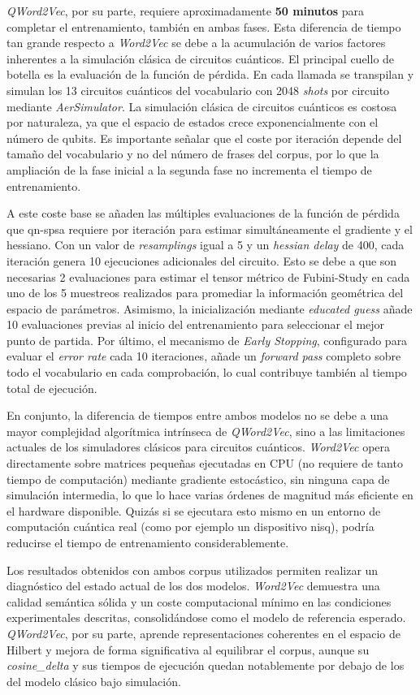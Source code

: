 \textit{QWord2Vec}, por su parte, requiere aproximadamente \textbf{50 minutos} para completar el entrenamiento, también en ambas fases. Esta diferencia de tiempo tan grande respecto a \textit{Word2Vec} se debe a la acumulación de varios factores inherentes a la simulación clásica de circuitos cuánticos. El principal cuello de botella es la evaluación de la función de pérdida. En cada llamada se transpilan y simulan los 13 circuitos cuánticos del vocabulario con 2048 \textit{shots} por circuito mediante \textit{AerSimulator}. La simulación clásica de circuitos cuánticos es costosa por naturaleza, ya que el espacio de estados crece exponencialmente con el número de qubits. Es importante señalar que el coste por iteración depende del tamaño del vocabulario y no del número de frases del corpus, por lo que la ampliación de la fase inicial a la segunda fase no incrementa el tiempo de entrenamiento.

A este coste base se añaden las múltiples evaluaciones de la función de pérdida que \gls{qn-spsa} requiere por iteración para estimar simultáneamente el gradiente y el hessiano. Con un valor de \textit{resamplings} igual a 5 y un \textit{hessian delay} de 400, cada iteración genera 10 ejecuciones adicionales del circuito. Esto se debe a que son necesarias 2 evaluaciones para estimar el tensor métrico de Fubini-Study en cada uno de los 5 muestreos realizados para promediar la información geométrica del espacio de parámetros. Asimismo, la inicialización mediante \textit{educated guess} añade 10 evaluaciones previas al inicio del entrenamiento para seleccionar el mejor punto de partida. Por último, el mecanismo de \textit{Early Stopping}, configurado para evaluar el \textit{error rate} cada 10 iteraciones, añade un \textit{forward pass} completo sobre todo el vocabulario en cada comprobación, lo cual contribuye también al tiempo total de ejecución.

En conjunto, la diferencia de tiempos entre ambos modelos no se debe a una mayor complejidad algorítmica intrínseca de \textit{QWord2Vec}, sino a las limitaciones actuales de los simuladores clásicos para circuitos cuánticos. \textit{Word2Vec} opera directamente sobre matrices pequeñas ejecutadas en CPU (no requiere de tanto tiempo de computación) mediante gradiente estocástico, sin ninguna capa de simulación intermedia, lo que lo hace varias órdenes de magnitud más eficiente en el hardware disponible. Quizás si se ejecutara esto mismo en un entorno de computación cuántica real (como por ejemplo un dispositivo \gls{nisq}), podría reducirse el tiempo de entrenamiento considerablemente.

Los resultados obtenidos con ambos corpus utilizados permiten realizar un diagnóstico del estado actual de los dos modelos. \textit{Word2Vec} demuestra una calidad semántica sólida y un coste computacional mínimo en las condiciones experimentales descritas, consolidándose como el modelo de referencia esperado. \textit{QWord2Vec}, por su parte, aprende representaciones coherentes en el espacio de Hilbert y mejora de forma significativa al equilibrar el corpus, aunque su \textit{cosine\_delta} y sus tiempos de ejecución quedan notablemente por debajo de los del modelo clásico bajo simulación.

